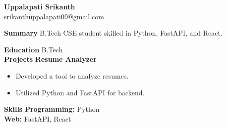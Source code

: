 \documentclass[10pt]{article}
\begin{document}
\begin{center}
    {\LARGE \textbf{Uppalapati Srikanth}} \\
    srikanthuppalapati09@gmail.com
\end{center}

\textbf{Summary}
B.Tech CSE student skilled in Python, FastAPI, and React.

\textbf{Education}
B.Tech\\

\textbf{Projects}
\textbf{Resume Analyzer}
\begin{itemize}
\item Developed a tool to analyze resumes.
\item Utilized Python and FastAPI for backend.
\end{itemize}

\textbf{Skills}
\textbf{Programming:} Python\\
\textbf{Web:} FastAPI, React\\
\end{document}
